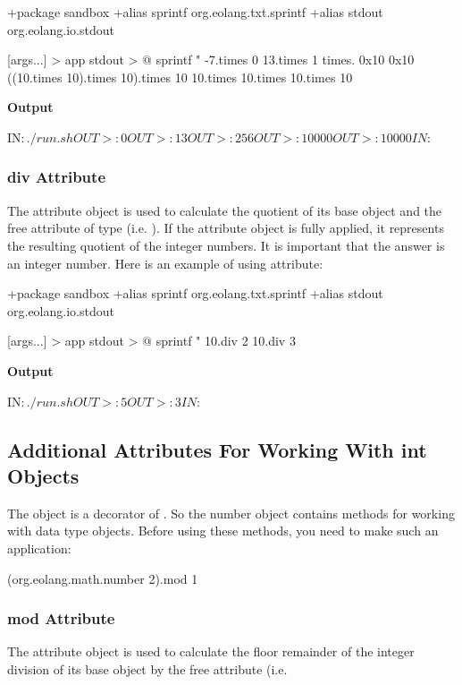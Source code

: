 \documentclass[12pt]{book}
\begin{document}
{\begin{ffcode}
+package sandbox
+alias sprintf org.eolang.txt.sprintf
+alias stdout org.eolang.io.stdout

[args...] > app
  stdout > @
    sprintf
      "%
      -7.times 0
      13.times 1
      times.
        0x10
        0x10
      ((10.times 10).times 10).times 10
      10.times 10.times 10.times 10

\end{ffcode}
\textbf{Output}
\begin{ffcode}

IN$: ./run.sh
OUT>: 0
OUT>: 13
OUT>: 256
OUT>: 10000
OUT>: 10000
IN$: 
\end{ffcode}

\subsubsection{div Attribute}
The  attribute object is used to calculate the quotient of its base  object and the free attribute  of type  (i.e. ).
If the  attribute object is fully applied, it represents the resulting quotient of the integer numbers. It is important that the answer is an integer number. Here is an example of using  attribute:

\begin{ffcode}
+package sandbox
+alias sprintf org.eolang.txt.sprintf
+alias stdout org.eolang.io.stdout

[args...] > app
  stdout > @
    sprintf
      "%
      10.div 2
      10.div 3
\end{ffcode}
\textbf{Output}
\begin{ffcode}
IN$: ./run.sh
OUT>: 5
OUT>: 3
IN$: 
\end{ffcode}



\subsection{Additional Attributes For Working With int Objects}
The object  is a decorator of . So the number object contains methods for working with  data type objects. Before using these methods, you need to make such an application:
\begin{ffcode}
(org.eolang.math.number 2).mod 1
\end{ffcode}

\subsubsection{mod Attribute}
The  attribute object is used to calculate the floor remainder of the integer division of its base  object by the  free attribute (i.e. \ff{$ %
If the \ff{mod} attribute object is fully applied, it represents the resulting floor modulus (remainder).
The modulus for \ff{x = 0} is undefined. The resulting floor modulus has the same sign as the divisor \ff{x}.
The relationship between the \ff{mod} and \ff{div} operations is as follows:
\ff{(x / y) * y + x %

}}}
\end{document}
